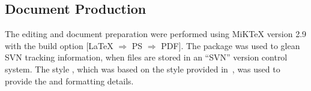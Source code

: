 \subsection{Document Production}
\label{lab:ssec_DocumentProduction}

The editing and document preparation were performed using MiK\TeX{} version 2.9  with the build option $[$\LaTeX{}  $\Rightarrow$ PS $\Rightarrow$ PDF$]$.
The  package was used to glean SVN tracking information, when files are stored in an ``SVN'' version control system.
The style {\tt \KNEADdocumentClsName}, which was based on the style provided in~\cite{ref__thesisguide}, was used to provide the \LaTeXx and \Biberx formatting details.